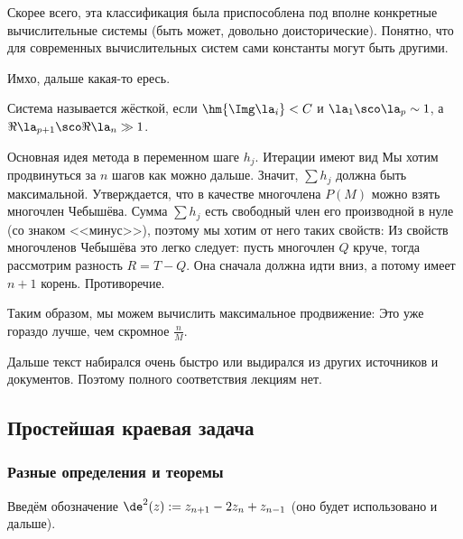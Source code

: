 \documentclass[a4paper]{article}
\begin{document}
\begin{petit}
Скорее всего, эта классификация была приспособлена под вполне
конкретные вычислительные системы (быть может, довольно
доисторические). Понятно, что для современных вычислительных систем
сами константы могут быть другими.
\end{petit}
\begin{petit}
  Имхо, дальше какая-то ересь. 
\end{petit}

\begin{df}
Система называется жёсткой, если $\hm{\Img \la_i} < C$ и
$\la_1\sco\la_p \sim 1$, а $\Re \la_{p+1}\sco \Re \la_n \gg 1$.
\end{df}

Основная идея метода в переменном шаге $h_j$.  Итерации имеют вид
  Мы хотим продвинуться за $n$
шагов как можно дальше. Значит, $\sum h_j$ должна быть максимальной.
Утверждается, что в качестве многочлена $P(M)$ можно взять многочлен
Чебышёва. Сумма $\sum h_j$ есть свободный член его производной в нуле
(со знаком <<минус>>), поэтому мы хотим от него таких свойств:
  Из свойств
многочленов Чебышёва это легко следует: пусть многочлен $Q$ круче,
тогда рассмотрим разность $R = T-Q$.  Она сначала должна идти вниз, а
потому имеет $n+1$ корень. Противоречие.

Таким образом, мы можем вычислить максимальное продвижение:   Это уже гораздо лучше, чем скромное $\frac nM$.

\begin{petit}
Дальше текст набирался очень быстро или выдирался из других источников
и документов.  Поэтому полного соответствия лекциям нет.
\end{petit}

\subsection{Простейшая краевая задача}

\subsubsection{Разные определения и теоремы}

Введём обозначение $\de^2 (z) := z_{n+1}-2z_n + z_{n-1}$ (оно будет
использовано и дальше).
\end{document}
